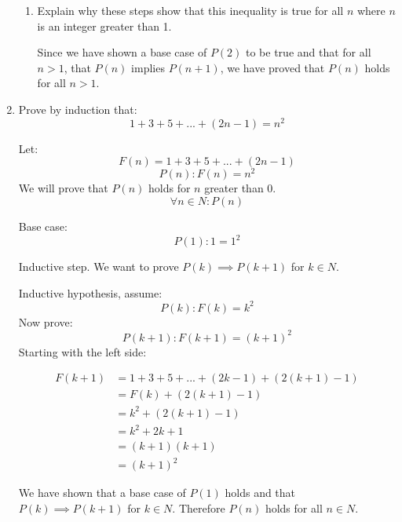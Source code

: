 \documentclass{article}
\begin{document}
\begin{enumerate}
\begin{enumerate}
  \item Explain why these steps show that this inequality is true for all $n$ where $n$ is an integer greater than 1.

Since we have shown a base case of $P(2)$ to be true and that for all $n > 1$, that $P(n)$ implies $P(n + 1)$, we have proved that $P(n)$ holds for all $n > 1$.
  \end{enumerate}

\item Prove by induction that:
\[ 1 + 3 + 5 + ... + (2n - 1) = n^2 \]

Let:
\[ F(n) = 1 + 3 + 5 + ... + (2n - 1) \]
\[ P(n): F(n) = n^2 \]
We will prove that $P(n)$ holds for $n$ greater than 0.
\[ \forall n \in N : P(n) \]

Base case:
\[ P(1): 1 = 1^2 \]

Inductive step. We want to prove $P(k) \implies P(k+1)$ for $k \in N$.

Inductive hypothesis, assume:
\[ P(k): F(k) = k^2 \]
Now prove:
\[ P(k + 1): F(k + 1) = (k + 1)^2 \]
Starting with the left side:

\begin{equation*}
\begin{aligned}
F(k + 1) &= 1 + 3 + 5 + ... + (2k - 1) + (2(k + 1) - 1) \\
&= F(k) + (2(k + 1) - 1) \\
&= k^2 + (2(k + 1) - 1) \\
&= k^2 + 2k + 1 \\
&= (k + 1)(k + 1) \\
&= (k + 1)^2
\end{aligned}
\end{equation*}

We have shown that a base case of $P(1)$ holds and that $P(k) \implies P(k + 1)$ for $k \in N$. Therefore $P(n)$ holds for all $n \in N$.
\end{enumerate}
\end{document}
